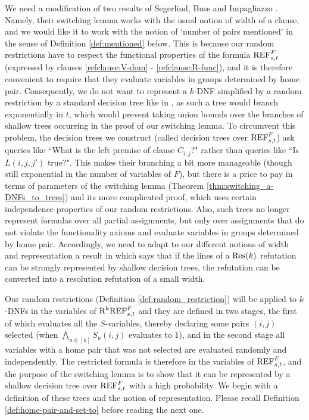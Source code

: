 We need a modification of two results of Segerlind, Buss and Impagliazzo \cite{segerlind-buss-impagliazzo}. Namely, their switching lemma works with the usual notion of width of a clause, and we would like it to work with the notion of `number of pairs mentioned' in the sense of Definition \ref{def:mentioned} below. This is because our random restrictions have to respect the functional properties of the formula $\textnormal{REF}^F_{s,t}$ (expressed by clauses \eqref{refclause:V-dom} - \eqref{refclause:R-func}), and it is therefore convenient to require that they evaluate variables in groups determined by home pair. Consequently, we do not want to represent a $k$-DNF simplified by a random restriction by a standard decision tree like in \cite{segerlind-buss-impagliazzo}, as such a tree would branch exponentially in $t$, which would prevent taking union bounds over the branches of shallow trees occurring in the proof of our switching lemma. To circumvent this problem, the decision trees we construct (called decision trees over $\textnormal{REF}^F_{s,t}$) ask queries like ``What is the left premise of clause $C_{i,j}$?" rather than queries like ``Is $L(i,j,j')$ true?". This makes their branching a bit more manageable (though still exponential in the number of variables of $F$), but there is a price to pay in terms of parameters of the switching lemma (Theorem \ref{thm:switching_a-DNFs_to_trees}) and its more complicated proof, which uses certain independence properties of our random restrictions. Also, such trees no longer represent formulas over all partial assignments, but only over assignments that do not violate the functionality axioms and evaluate variables in groups determined by home pair. Accordingly, we need to adapt to our different notions of width and representation a result in \cite{segerlind-buss-impagliazzo} which says that if the lines of a $\textnormal{Res}(k)$ refutation can be strongly represented by shallow decision trees, the refutation can be converted into a resolution refutation of a small width.

Our random restrictions (Definition \ref{def:random_restriction}) will be applied to $k$-DNFs in the variables of $\textnormal{R}^k\textnormal{REF}^F_{s,t}$ and they are defined in two stages, the first of which evaluates all the $S$-variables, thereby declaring some pairs $(i,j)$ selected (when $\bigwedge_{u \in [k]}S_u(i,j)$ evaluates to 1), and in the second stage all variables with a home pair that was not selected are evaluated randomly and independently. The restricted formula is therefore in the variables of $\textnormal{REF}^F_{s,t}$, and the purpose of the switching lemma is to show that it can be represented by a shallow decision tree over $\textnormal{REF}^F_{s,t}$ with a high probability. We begin with a definition of these trees and the notion of representation.
Please recall Definition \ref{def:home-pair-and-set-to} before reading the next one.

